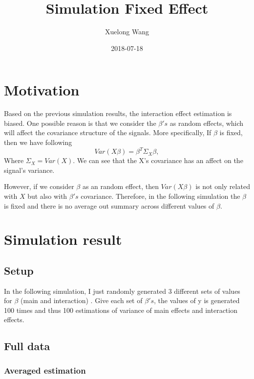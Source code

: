 \documentclass[]{article}
\title{Simulation Fixed Effect}
\author{Xuelong Wang}
\date{2018-07-18}
\begin{document}
\maketitle

{
\setcounter{tocdepth}{2}
\tableofcontents
}
\section{Motivation}\label{motivation}

Based on the previous simulation results, the interaction effect
estimation is biased. One possible reason is that we consider the
\(\beta's\) as random effects, which will affect the covariance
structure of the signals. More specifically, If \(\beta\) is fixed, then
we have following \[
  Var(X\beta) = \beta^T\Sigma_{X}\beta,
\] Where \(\Sigma_{X} = Var(X)\). We can see that the X's covariance has
an affect on the signal's variance.

However, if we consider \(\beta\) as an random effect, then
\(Var(X\beta)\) is not only related with \(X\) but also with \(\beta's\)
covariance. Therefore, in the following simulation the \(\beta\) is
fixed and there is no average out summary across different values of
\(\beta\).

\section{Simulation result}\label{simulation-result}

\subsection{Setup}\label{setup}

In the following simulation, I just randomly generated 3 different sets
of values for \(\beta\) (main and interaction) . Give each set of
\(\beta's\), the values of y is generated 100 times and thus 100
estimations of variance of main effects and interaction effects.

\subsection{Full data}\label{full-data}

\subsubsection{Averaged estimation}\label{averaged-estimation}
\end{document}
